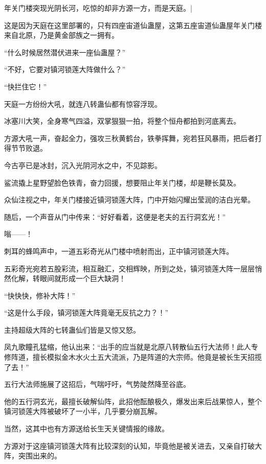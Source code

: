 
\begin{this_body}

年关门楼突现光阴长河，吃惊的却非方源一方，而是天庭。|

这是因为天庭在这里部署的，只有四座宙道仙蛊屋，这第五座宙道仙蛊屋年关门楼来自北原，乃是黄金部族之一拥有。

“什么时候居然潜伏进来一座仙蛊屋？”

“不好，它要对镇河锁莲大阵做什么？”

“快拦住它！”

天庭一方纷纷大吼，就连八转蛊仙都有惊容浮现。

冰塞川大笑，全身寒气四溢，双掌狠狠一拍，将整个恒舟都拍到河底离去。

方源大吼一声，奋起全力，强攻三秋黄鹤台，铁拳挥舞，宛若狂风暴雨，把后者打得节节败退。

今古亭已是冰封，沉入光阴河水之中，不见踪影。

鲨流撬上星野望脸色铁青，奋力回援，想要阻止年关门楼，却是鞭长莫及。

众仙注视之中，年关门楼接近镇河锁莲大阵，门中开始闪耀出莹润的洁白光晕。

随后，一个声音从门中传来：“好好看着，这便是老夫的五行洞玄光！”

嗡——！

刺耳的蜂鸣声中，一道五彩奇光从门楼中喷射而出，正中镇河锁莲大阵。

五彩奇光宛若五股彩流，相互融汇，交相辉映，所到之处，镇河锁莲大阵一层层悄然化解，转眼间就形成一个巨大缺洞！

“快快快，修补大阵！”

“这是什么手段，镇河锁莲大阵竟毫无反抗之力？！”

主持超级大阵的七转蛊仙们皆是又惊又怒。

凤九歌瞳孔猛缩，他认出来：“出手的应当就是北原八转散仙五行大法师！此人专修阵道，擅长模拟金木水火土五大流派，乃是阵道的大宗师。他竟是被长生天招揽了去！”

五行大法师施展了这招后，气喘吁吁，气势陡然降至谷底。

他的五行洞玄光，最擅长破解仙阵，此招他酝酿极久，爆发出来后战果惊人，整个镇河锁莲大阵被破坏了一小半，几乎要分崩瓦解。

当然，这其中也有方源送给长生天关键情报的缘故。

方源对于这座镇河锁莲大阵有比较深刻的认知，毕竟他是被关进去，又亲自打破大阵，突围出来的。


\end{this_body}
